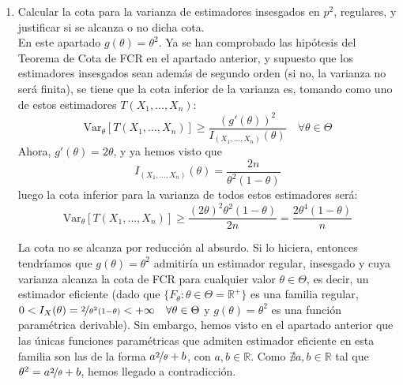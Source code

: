 \documentclass[12pt]{article}
\newcommand{\V}{\mathrm{Var}}
\newcommand{\R}{\mathbb{R}}
\newcommand{\Rmas}{\R^{+}}
\begin{document}
\begin{ejercicio}[2.25 puntos]
\begin{enumerate}[label=\alph*)]
\begin{enumerate}[label=\alph*)]
                    \item Calcular la cota para la varianza de estimadores insesgados en $p^2$, regulares, y justificar si se alcanza o no dicha cota. \\
                    
                    En este apartado $g(\theta) = \theta^2$. Ya se han comprobado las hipótesis del Teorema de Cota de FCR en el apartado anterior, y 
                    supuesto que los estimadores insesgados sean además de segundo orden (si no, la varianza no será finita), se tiene que
                    la cota inferior de la varianza es, tomando como uno de estos estimadores $T(X_1, \ldots, X_n)$:
                    $$\V_\theta[T(X_1, \ldots, X_n)] \geqslant \dfrac{(g'(\theta))^2}{I_{(X_1, \ldots, X_n)}(\theta)} \quad \forall \theta \in \Theta$$
                    Ahora, $g'(\theta) = 2\theta$, y ya hemos visto que 
                    $$I_{(X_1, \ldots, X_n)}(\theta) = \dfrac{2n}{\theta^2(1-\theta)}$$
                    luego la cota inferior para la varianza de todos estos estimadores será:
                    $$\V_\theta[T(X_1, \ldots, X_n)] \geqslant \dfrac{(2\theta)^2 \theta^2 (1-\theta)}{2n} = \dfrac{2 \theta^4 (1-\theta)}{n}$$ 

                    La cota no se alcanza por reducción al absurdo. Si lo hiciera, entonces tendríamos que $g (\theta) = \theta^2$ admitiría
                    un estimador regular, insesgado y cuya varianza alcanza la cota de FCR para cualquier valor $\theta \in \Theta$, 
                    es decir, un estimador eficiente (dado que $\{F_\theta : \theta \in \Theta = \Rmas\}$ es una familia regular, $0 < I_X(\theta) = \nicefrac{2}{\theta^2(1-\theta)} < + \infty
                    \quad \forall \theta \in \Theta$ y $g(\theta) = \theta^2$ es una función paramétrica derivable). Sin embargo, 
                    hemos visto en el apartado anterior que las únicas funciones paramétricas que admiten estimador eficiente en esta familia son las 
                    de la forma $a \nicefrac{2}{\theta} + b$, con $a, b \in \R$. Como $\nexists a,b \in \R$ tal que $\theta^2 = a \nicefrac{2}{\theta} + b$, hemos llegado a contradicción.  

                \end{enumerate}
        \end{enumerate}
    \end{ejercicio}

    \newpage
\end{document}
